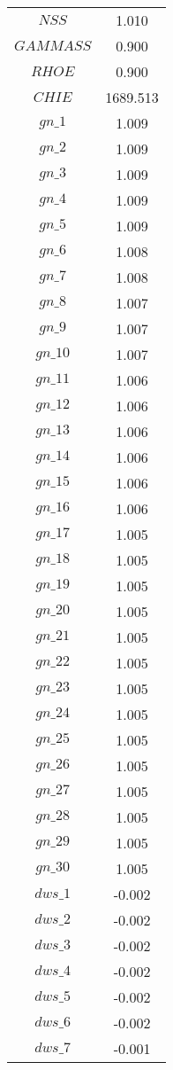 \begin{center}
\begin{longtable}{cc}
$NSS$ 	 & 	 1.010 \\
$GAMMASS$ 	 & 	 0.900 \\
$RHOE$ 	 & 	 0.900 \\
$CHIE$ 	 & 	 1689.513 \\
$gn\_1$ 	 & 	 1.009 \\
$gn\_2$ 	 & 	 1.009 \\
$gn\_3$ 	 & 	 1.009 \\
$gn\_4$ 	 & 	 1.009 \\
$gn\_5$ 	 & 	 1.009 \\
$gn\_6$ 	 & 	 1.008 \\
$gn\_7$ 	 & 	 1.008 \\
$gn\_8$ 	 & 	 1.007 \\
$gn\_9$ 	 & 	 1.007 \\
$gn\_10$ 	 & 	 1.007 \\
$gn\_11$ 	 & 	 1.006 \\
$gn\_12$ 	 & 	 1.006 \\
$gn\_13$ 	 & 	 1.006 \\
$gn\_14$ 	 & 	 1.006 \\
$gn\_15$ 	 & 	 1.006 \\
$gn\_16$ 	 & 	 1.006 \\
$gn\_17$ 	 & 	 1.005 \\
$gn\_18$ 	 & 	 1.005 \\
$gn\_19$ 	 & 	 1.005 \\
$gn\_20$ 	 & 	 1.005 \\
$gn\_21$ 	 & 	 1.005 \\
$gn\_22$ 	 & 	 1.005 \\
$gn\_23$ 	 & 	 1.005 \\
$gn\_24$ 	 & 	 1.005 \\
$gn\_25$ 	 & 	 1.005 \\
$gn\_26$ 	 & 	 1.005 \\
$gn\_27$ 	 & 	 1.005 \\
$gn\_28$ 	 & 	 1.005 \\
$gn\_29$ 	 & 	 1.005 \\
$gn\_30$ 	 & 	 1.005 \\
$dws\_1$ 	 & 	 -0.002 \\
$dws\_2$ 	 & 	 -0.002 \\
$dws\_3$ 	 & 	 -0.002 \\
$dws\_4$ 	 & 	 -0.002 \\
$dws\_5$ 	 & 	 -0.002 \\
$dws\_6$ 	 & 	 -0.002 \\
$dws\_7$ 	 & 	 -0.001 \\

\end{longtable}
\end{center}
